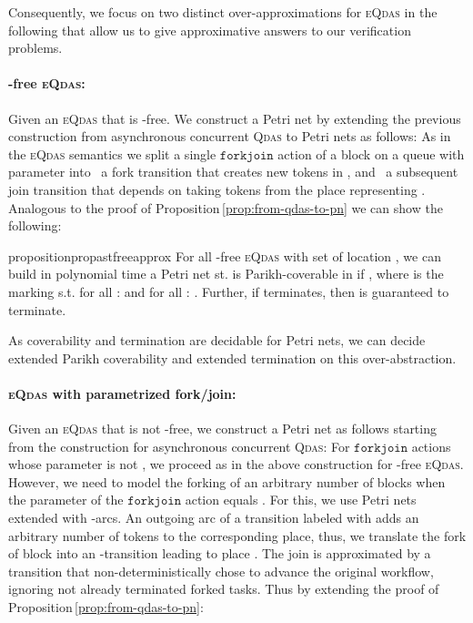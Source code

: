 \documentclass[runningheads,oribibl,]{article}
\newcommand{\cfont}[1]{\ensuremath{\mathtt{#1}}\xspace}
\newcommand{\qdas}{\textsc{Qdas}\xspace}
\newcommand{\eqdas}{\textsc{eQdas}\xspace}
\newcommand{\forkjoin}{\ensuremath{\cfont{forkjoin}}\xspace}
\begin{document}
Consequently, we focus on two distinct over-approximations for \eqdas in
the following that allow us to give  approximative answers to our
verification problems.

\paragraph{\bf -free \eqdas:}
Given an \eqdas  that is -free. We construct
a Petri net  by extending the previous
construction from asynchronous concurrent \qdas to Petri nets as
follows: As in the \eqdas semantics we split a single \forkjoin
action of a block  on a queue  with parameter 
into ~a fork transition that creates  new tokens in
, and ~a subsequent join transition that depends on
taking  tokens from the place representing .
Analogous to the proof of Proposition\,\ref{prop:from-qdas-to-pn} we can show
the following:

\begin{restatable}{proposition}{propastfreeapprox}
  \label{prop:astfreeapprox}
  For all -free \eqdas with set of location , we can build
  in polynomial time a Petri net  st.  is
  Parikh-coverable in  if , where 
  is the marking s.t. for all :  and for all : . Further, if
   terminates, then  is guaranteed to terminate.
\end{restatable}

As coverability and termination are decidable for Petri nets, we can
decide extended Parikh coverability and extended termination
on this over-abstraction.

\paragraph{\bf \eqdas with  parametrized fork/join:}
Given an \eqdas  that is not -free, we construct
a Petri net  as follows
starting from the construction for
asynchronous concurrent \qdas: For \forkjoin actions
whose parameter is not , we proceed as in the above
construction for -free \eqdas. However, we need to model
the forking of an arbitrary number of blocks when the parameter of
the \forkjoin action equals . For this, we use Petri nets
extended with -arcs. An outgoing arc of a transition labeled
with  adds an arbitrary number of tokens to the corresponding
place, thus, we translate the fork of block  into an
-transition leading to place . The join is
approximated by a transition that non-deterministically chose to
advance the original workflow, ignoring not already terminated forked
tasks. Thus by extending the proof of
Proposition\,\ref{prop:from-qdas-to-pn}:
\end{document}
